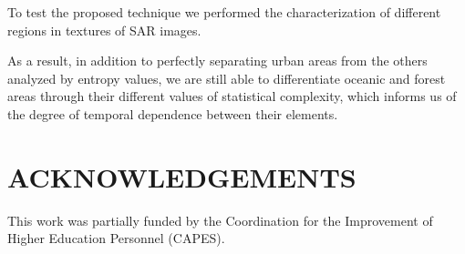 \documentclass{isprs}
\begin{document}
To test the proposed technique we performed the characterization of different regions in textures of SAR images.

As a result, in addition to perfectly separating urban areas from the others analyzed by entropy values, we are still able to differentiate oceanic and forest areas through their different values of statistical complexity, which informs us of the degree of temporal dependence between their elements.




\section*{ACKNOWLEDGEMENTS}\label{ACKNOWLEDGEMENTS}

This work was partially funded by the Coordination for the Improvement of Higher Education Personnel (CAPES).
\end{document}
